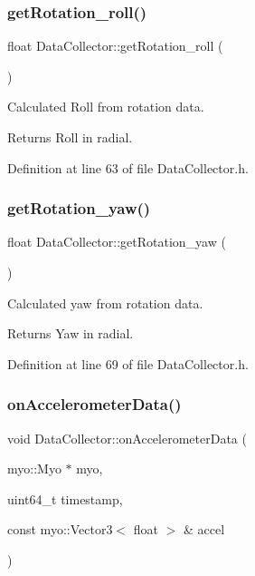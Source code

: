 \subsubsection{\texorpdfstring{get\+Rotation\+\_\+roll()}{getRotation\_roll()}}
{\footnotesize\ttfamily float Data\+Collector\+::get\+Rotation\+\_\+roll (\begin{DoxyParamCaption}{ }\end{DoxyParamCaption})\hspace{0.3cm}{\ttfamily [inline]}}



Calculated Roll from rotation data. 

\begin{DoxyReturn}{Returns}
Roll in radial. 
\end{DoxyReturn}


Definition at line 63 of file Data\+Collector.\+h.

\mbox{\label{class_data_collector_a45175c5352dd3870c2d1cf99c4b2d938}} 
\subsubsection{\texorpdfstring{get\+Rotation\+\_\+yaw()}{getRotation\_yaw()}}
{\footnotesize\ttfamily float Data\+Collector\+::get\+Rotation\+\_\+yaw (\begin{DoxyParamCaption}{ }\end{DoxyParamCaption})\hspace{0.3cm}{\ttfamily [inline]}}



Calculated yaw from rotation data. 

\begin{DoxyReturn}{Returns}
Yaw in radial. 
\end{DoxyReturn}


Definition at line 69 of file Data\+Collector.\+h.

\mbox{\label{class_data_collector_af284c1bda701eb04d8278848672a1be6}} 
\subsubsection{\texorpdfstring{on\+Accelerometer\+Data()}{onAccelerometerData()}}
{\footnotesize\ttfamily void Data\+Collector\+::on\+Accelerometer\+Data (\begin{DoxyParamCaption}\item[{myo\+::\+Myo $\ast$}]{myo,  }\item[{uint64\+\_\+t}]{timestamp,  }\item[{const myo\+::\+Vector3$<$ float $>$ \&}]{accel }\end{DoxyParamCaption})}



